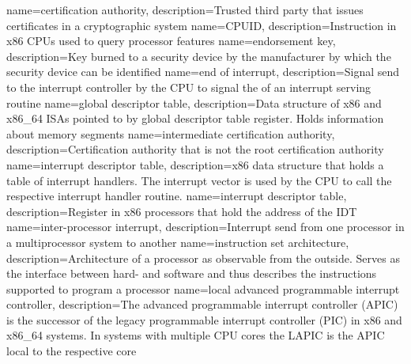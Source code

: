 
%
{
    name=certification authority,
    description={Trusted third party that issues certificates in a cryptographic system}
}
{
    name=CPUID,
    description={Instruction in x86 CPUs used to query processor features}
}
%
{
    name=endorsement key,
    description={Key burned to a security device by the manufacturer by which the security device can be identified}
}
{
    name=end of interrupt,
    description={Signal send to the interrupt controller by the CPU to signal the of an interrupt serving routine}
}
%
{
    name=global descriptor table,
    description={Data structure of x86 and x86\_64 ISAs pointed to by global descriptor table register.
            Holds information about memory segments}
}
%
{
    name=intermediate certification authority,
    description={Certification authority that is not the root certification authority}
}
{
    name=interrupt descriptor table,
    description={x86 data structure that holds a table of interrupt handlers. The interrupt vector is used by the CPU to
            call the respective interrupt handler routine.}
}
{
    name=interrupt descriptor table,
    description={Register in x86 processors that hold the address of the IDT}
}
{
    name=inter-processor interrupt,
    description={Interrupt send from one processor in a multiprocessor system to another}
}
{
    name=instruction set architecture,
    description={Architecture of a processor as observable from the outside. Serves as the interface between hard- and
            software and thus describes the instructions supported to program a processor}
}
%
{
    name=local advanced programmable interrupt controller,
    description={The advanced programmable interrupt controller (APIC) is the successor of the legacy programmable
            interrupt controller (PIC) in x86 and x86\_64 systems. In systems with multiple CPU cores the LAPIC is the
            APIC local to the respective core}
}
